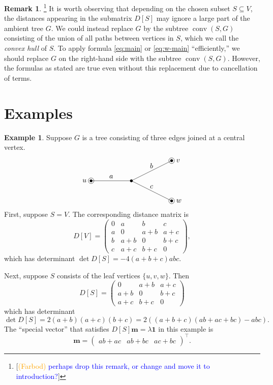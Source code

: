 \documentclass[12pt]{amsart}
\theoremstyle{definition}
\newtheorem{eg}[thm]{Example}
\newtheorem{rmk}[thm]{Remark}
\newcommand{\boldm}{\mathbf{m}}
\newcommand{\tr}{\intercal}
\DeclareMathOperator{\conv}{conv}
\newcommand\farbod[1]{\footnote{[\textcolor{orange}{(Farbod)} \textcolor{blue}{#1}]}}
\begin{document}
\begin{rmk}\farbod{perhaps drop this remark, or change and move it to introduction?}
It is worth observing that depending on the chosen subset $S \subseteq V$, the distances appearing in the submatrix $D[S]$ may ignore a large part of the ambient tree $G$.
We could instead replace $G$ by the subtree  $\conv(S,G)$ consisting of the union of all paths between vertices in $S$,
which we call the {\em convex hull} of $S$.
To apply formula \eqref{eq:main} or \eqref{eq:w-main} ``efficiently,''
we should replace $G$ on the right-hand side with the subtree $\conv(S,G)$.
However, the formulas as stated are true even without this replacement due to cancellation of terms.
\end{rmk}



\section{Examples}
\label{sec:examples}
\begin{eg}
Suppose $G$ is a tree consisting of three edges joined at a central vertex.
\[
\begin{tikzpicture}
	\coordinate (u) at (-2,0);
	\coordinate (v) at (2,1);
	\coordinate (w) at (2,-1);
	\coordinate (o) at (0,0);

	\draw (o) -- node[above] {$a$} (u);
	\draw (v) -- node[above] {$b$} (o)
		-- node[above] {$c$} (w);

	\foreach \c in {u, v, w, o} {
		\fill (\c) circle (2pt);
	}
	\foreach \c in {u, v, w} {
		\draw (\c) circle (4pt);
	}
	
	\node[left=3pt] at (u) {$u$};
	\node[right=3pt] at (v) {$v$};
	\node[right=3pt] at (w) {$w$};
\end{tikzpicture}
\]
First, suppose $S = V$.
The corresponding distance matrix is
\[
	D[V] = \begin{pmatrix}
	0 & a & b & c \\
	a & 0 & a + b & a + c \\
	b & a + b & 0 & b + c \\
	c & a + c & b + c & 0
	\end{pmatrix},
\]
which has determinant
$
	\det D[S] = -4(a+b+c)abc.
$

Next, suppose $S$ consists of the leaf vertices $ \{u,v,w\}$.
Then 
\[
	D[S] = \begin{pmatrix}
	0 & a + b & a + c \\
	a + b & 0 & b + c \\
	a + c & b + c & 0
	\end{pmatrix}
\]
which has determinant
\[\det D[S] = 2(a+b)(a+c)(b+c) 
	= 2\left( (a+b+c)(ab + ac + bc) - abc \right).
\]
The ``special vector'' that satisfies $D[S] \boldm = \lambda \mathbf{1}$ in this example is 
\[
	\boldm = \begin{pmatrix} 
	ab + ac & 
	ab + bc &
	ac + bc 
	\end{pmatrix}^\tr.
\]
\end{eg}
\end{document}
